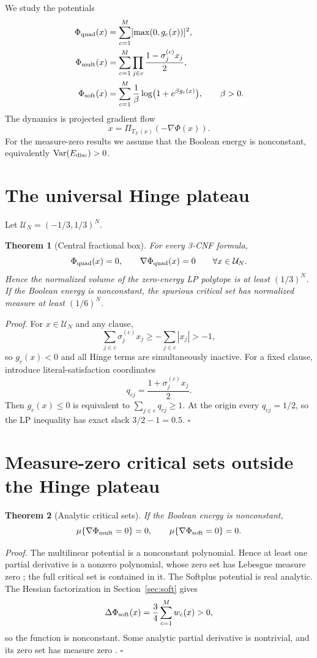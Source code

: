 \documentclass[11pt,a4paper]{article}
\newtheorem{theorem}{Theorem}[section]
\newcommand{\X}{\mathcal X}
\begin{document}
We study the potentials
\begin{align}
\Phi_{\rm quad}(x)&=\sum_{c=1}^M[\max(0,g_c(x))]^2,\\
\Phi_{\rm mult}(x)&=\sum_{c=1}^M\prod_{j\in c}\frac{1-\sigma_j^{(c)}x_j}{2},\\
\Phi_{\rm soft}(x)&=\sum_{c=1}^M\frac1\beta\log\bigl(1+e^{\beta g_c(x)}\bigr),\qquad \beta>0.
\end{align}
The dynamics is projected gradient flow
\begin{equation}
\dot x=\Pi_{T_\X(x)}(-\nabla\Phi(x)).
\end{equation}
For the measure-zero results we assume that the Boolean energy is nonconstant, equivalently $\operatorname{Var}(E_{\rm disc})>0$.

\section{The universal Hinge plateau}
Let $\mathcal U_N=(-1/3,1/3)^N$.

\begin{theorem}[Central fractional box]
For every 3-CNF formula,
\[
\Phi_{\rm quad}(x)=0,\qquad \nabla\Phi_{\rm quad}(x)=0\qquad \forall x\in\mathcal U_N.
\]
Hence the normalized volume of the zero-energy LP polytope is at least $(1/3)^N$. If the Boolean energy is nonconstant, the spurious critical set has normalized measure at least $(1/6)^N$.
\end{theorem}

\noindent\textit{Proof.} For $x\in\mathcal U_N$ and any clause,
\[
\sum_{j\in c}\sigma_j^{(c)}x_j\ge-\sum_{j\in c}|x_j|>-1,
\]
so $g_c(x)<0$ and all Hinge terms are simultaneously inactive. For a fixed clause, introduce literal-satisfaction coordinates
\[
q_{cj}=\frac{1+\sigma_j^{(c)}x_j}{2}.
\]
Then $g_c(x)\le0$ is equivalent to $\sum_{j\in c}q_{cj}\ge1$. At the origin every $q_{cj}=1/2$, so the LP inequality has exact slack $3/2-1=0.5$. \hfill$\square$

\section{Measure-zero critical sets outside the Hinge plateau}
\begin{theorem}[Analytic critical sets]
If the Boolean energy is nonconstant,
\[
\mu\{\nabla\Phi_{\rm mult}=0\}=0,\qquad \mu\{\nabla\Phi_{\rm soft}=0\}=0.
\]
\end{theorem}

\noindent\textit{Proof.} The multilinear potential is a nonconstant polynomial. Hence at least one partial derivative is a nonzero polynomial, whose zero set has Lebesgue measure zero \cite{Okamoto,Caron}; the full critical set is contained in it. The Softplus potential is real analytic. The Hessian factorization in Section~\ref{sec:soft} gives
\[
\Delta\Phi_{\rm soft}(x)=\frac34\sum_{c=1}^M w_c(x)>0,
\]
so the function is nonconstant. Some analytic partial derivative is nontrivial, and its zero set has measure zero \cite{Krantz}. \hfill$\square$
\end{document}
